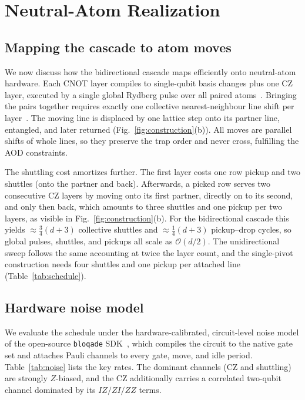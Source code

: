 \documentclass[conference]{IEEEtran}
\newcommand{\bigo}[1]{\mathcal{O}(#1)}
\begin{document}
\section{Neutral-Atom Realization}\label{sec:na-realization}

\subsection{Mapping the cascade to atom moves}\label{sec:na-moves}
We now discuss how the bidirectional cascade maps efficiently onto
neutral-atom hardware. Each CNOT layer compiles to single-qubit basis changes
plus one CZ layer, executed by a single global Rydberg pulse over all paired
atoms~\cite{evered2023gates}. Bringing the pairs together requires exactly
one collective nearest-neighbour line shift per
layer~\cite{bluvstein2022transport}. The moving line is displaced by one
lattice step onto its partner line, entangled, and later returned
(Fig.~\ref{fig:construction}(b)). All moves are parallel shifts of whole
lines, so they preserve the trap order and never cross, fulfilling the AOD
constraints.

The shuttling cost amortizes further. The first layer costs one row pickup
and two shuttles (onto the partner and back). Afterwards, a picked row serves
two consecutive CZ layers by moving onto its first partner, directly on to
its second, and only then back, which amounts to three shuttles and one
pickup per two layers, as visible in Fig.~\ref{fig:construction}(b). For the
bidirectional cascade this yields $\approx\frac{3}{4}(d{+}3)$ collective
shuttles and $\approx\frac{1}{4}(d{+}3)$ pickup--drop cycles, so global
pulses, shuttles, and pickups all scale as $\bigo{d/2}$. The unidirectional sweep
follows the same accounting at twice the layer count, and the single-pivot
construction needs four shuttles and one pickup per attached line
(Table~\ref{tab:schedule}).

\subsection{Hardware noise model}\label{sec:na-noise}
We evaluate the schedule under the hardware-calibrated, circuit-level noise
model of the open-source \texttt{bloqade} SDK~\cite{tool:bloqade}, which
compiles the circuit to the native gate set and attaches Pauli channels to
every gate, move, and idle period. Table~\ref{tab:noise} lists the key
rates. The dominant channels (CZ and shuttling) are strongly $Z$-biased, and
the CZ additionally carries a correlated two-qubit channel dominated by its
$IZ/ZI/ZZ$ terms.
\end{document}

